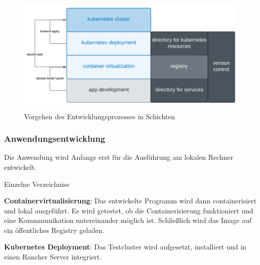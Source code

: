 \begin{figure}[!htb]
    \centering
    \includegraphics[width=1.0\columnwidth]{images/Schichtenentwurf.png}
    \caption{Vorgehen des Entwicklungsprozesses in Schichten}
    \label{fig:Schichtenentwurf}
  \end{figure}

\subsubsection{Anwendungsentwicklung}
Die Anwendung wird Anfangs erst für die Ausführung am lokalen Rechner entwickelt.

Einzelne Verzeichnise 

\textbf{Containervirtualisierung}: 
Das entwickelte Programm wird dann containerisiert und lokal ausgeführt.
Es wird getestet, ob die Containerisierung funktioniert und eine Kommmunikation
untereinander möglich ist. Schließlich wird das Image auf ein öffentliches Registry geladen.

\textbf{Kubernetes Deployment}: 
Das Testcluster wird aufgesetzt, installiert und in einen Rancher Server integriert.




